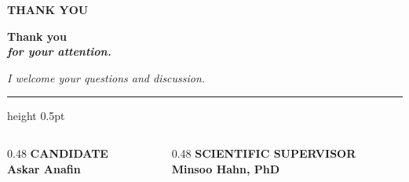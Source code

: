 \documentclass[11pt,aspectratio=169]{beamer}
\begin{document}
\begin{frame}[plain]
    \vspace*{0.2cm}
    {\color{rust}\fontsize{10}{12}\selectfont\sffamily\bfseries THANK YOU}
    \vspace*{1.0cm}
    
    {\color{slate}\rmfamily\Huge\bfseries Thank you\\{\color{rust}\itshape for your attention.}}
    \vspace*{0.4cm}
    
    {\color{slate}\fontsize{18}{22}\selectfont\sffamily\itshape I welcome your questions and discussion.}
    
    \vspace*{1.3cm}
    {\color{slate}\hrule height 0.5pt}
    \vspace*{0.3cm}
    
    \begin{columns}[T]
        \begin{column}{0.48\textwidth}
            \flushleft
            {\color{mutedgray}\fontsize{9}{11}\selectfont\sffamily\bfseries CANDIDATE}\\[0.1cm]
            {\color{slate}\large\rmfamily\bfseries Askar Anafin}
        \end{column}
        \begin{column}{0.48\textwidth}
            \flushright
            {\color{mutedgray}\fontsize{9}{11}\selectfont\sffamily\bfseries SCIENTIFIC SUPERVISOR}\\[0.1cm]
            {\color{slate}\large\rmfamily\bfseries Minsoo Hahn, PhD}
        \end{column}
    \end{columns}
\end{frame}
\end{document}
